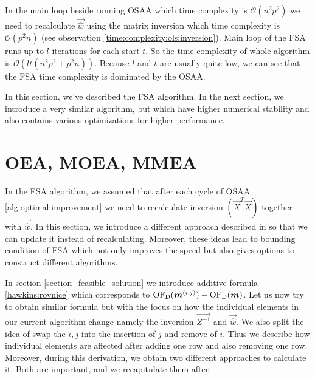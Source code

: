 \begin{observation}  \label{time:complexity:fsa}
In the main loop beside running OSAA which time complexity is $\mathcal{O}(n^2p^2)$ we need to recalculate $\vec{\hat{w}}$ using the matrix inversion which time complexity is $\mathcal{O}(p^2n)$ (see observation \ref{time:complexity:ols:inversion}).
Main loop of the FSA runs up to $l$ iterations for each start $t$. So the time complexity of whole algorithm is  $\mathcal{O}( lt(n^2p^2 + p^2n)  )$. Because $l$ and $t$ are usually quite low, we can see that the FSA time complexity is dominated by the OSAA. 
\end{observation} 

In this section, we've described the FSA algorithm. In the next section, we introduce a very similar algorithm, but which have higher numerical stability and also contains various optimizations for higher performance.








\section{OEA, MOEA, MMEA} \label{oeamoeammea}

In the FSA algorithm, we assumed that after each cycle of OSAA 
\ref{alg:optimal:improvement} we need to recalculate inversion $(\vec{X}^T\vec{X})$ together with $\vec{\hat{w}}$. In this section, we introduce a different approach described in \cite{agullo2001new} so that we can update it instead of recalculating. Moreover, these ideas lead to bounding condition of FSA which not only improves the speed but also gives options to construct different algorithms. 

In section \ref{section_feasible_solution} we introduce additive formula \ref{hawkins:rovnice} which corresponds to $\operatorname{OF_D}(\boldsymbol{m}^{(i,j)}) - \operatorname{OF_D}(\boldsymbol{m})$. Let us now try to obtain similar formula but with the focus on how the individual elements in our current algorithm change namely the inversion $\vec{Z^{-1}}$ and $\vec{\hat{w}}$. We also split the idea of swap the $i, j$ into the insertion of $j$ and remove of $i$. Thus we describe how individual elements are affected after adding one row and also removing one row. Moreover, during this derivation, we obtain two different approaches to calculate it. Both are important, and we recapitulate them after.




